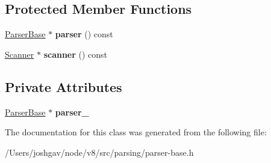 \subsection*{Protected Member Functions}
\begin{DoxyCompactItemize}
\item 
\hyperlink{classv8_1_1internal_1_1_parser_base}{Parser\+Base} $\ast$ {\bfseries parser} () const \hypertarget{classv8_1_1internal_1_1_parser_base_1_1_object_literal_checker_base_ad28123c30d690cbee780a1863daeb336}{}\label{classv8_1_1internal_1_1_parser_base_1_1_object_literal_checker_base_ad28123c30d690cbee780a1863daeb336}

\item 
\hyperlink{classv8_1_1internal_1_1_scanner}{Scanner} $\ast$ {\bfseries scanner} () const \hypertarget{classv8_1_1internal_1_1_parser_base_1_1_object_literal_checker_base_af56f3396e1e53a99ab4d408f271826c0}{}\label{classv8_1_1internal_1_1_parser_base_1_1_object_literal_checker_base_af56f3396e1e53a99ab4d408f271826c0}

\end{DoxyCompactItemize}
\subsection*{Private Attributes}
\begin{DoxyCompactItemize}
\item 
\hyperlink{classv8_1_1internal_1_1_parser_base}{Parser\+Base} $\ast$ {\bfseries parser\+\_\+}\hypertarget{classv8_1_1internal_1_1_parser_base_1_1_object_literal_checker_base_a113868d928fe063dccab7769b85e7113}{}\label{classv8_1_1internal_1_1_parser_base_1_1_object_literal_checker_base_a113868d928fe063dccab7769b85e7113}

\end{DoxyCompactItemize}


The documentation for this class was generated from the following file\+:\begin{DoxyCompactItemize}
\item 
/\+Users/joshgav/node/v8/src/parsing/parser-\/base.\+h\end{DoxyCompactItemize}
